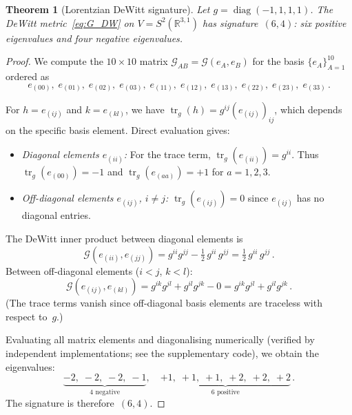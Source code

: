 \documentclass[12pt,a4paper]{article}
\newtheorem{theorem}{Theorem}[section]
\theoremstyle{definition}
\newcommand{\tr}{\operatorname{tr}}
\newcommand{\diag}{\operatorname{diag}}
\newcommand{\R}{\mathbb{R}}
\begin{document}
\begin{theorem}[Lorentzian DeWitt signature]
\label{thm:signature}
Let $g = \diag(-1,1,1,1)$.
The DeWitt metric~\eqref{eq:G_DW} on $V = S^2(\R^{3,1})$ has signature~$(6,4)$: six positive eigenvalues and four negative eigenvalues.
\end{theorem}

\begin{proof}
We compute the $10 \times 10$ matrix $\mathcal{G}_{AB} = \mathcal{G}(e_A, e_B)$ for the basis $\{e_A\}_{A=1}^{10}$ ordered as
\[
e_{(00)},\; e_{(01)},\; e_{(02)},\; e_{(03)},\; e_{(11)},\; e_{(12)},\; e_{(13)},\; e_{(22)},\; e_{(23)},\; e_{(33)}\,.
\]

For $h = e_{(ij)}$ and $k = e_{(kl)}$, we have $\tr_g(h) = g^{ij} (e_{(ij)})_{ij}$, which depends on the specific basis element.
Direct evaluation gives:
\begin{itemize}[nosep]
\item \emph{Diagonal elements $e_{(ii)}$:}
For the trace term, $\tr_g(e_{(ii)}) = g^{ii}$.
Thus $\tr_g(e_{(00)}) = -1$ and $\tr_g(e_{(aa)}) = +1$ for $a = 1,2,3$.

\item \emph{Off-diagonal elements $e_{(ij)}$, $i \ne j$:}
$\tr_g(e_{(ij)}) = 0$ since $e_{(ij)}$ has no diagonal entries.
\end{itemize}

The DeWitt inner product between diagonal elements is
\begin{equation}
\mathcal{G}(e_{(ii)}, e_{(jj)}) = g^{ii}g^{jj} - \tfrac{1}{2}\, g^{ii}\, g^{jj} = \tfrac{1}{2}\, g^{ii}\, g^{jj}\,.
\end{equation}
Between off-diagonal elements ($i < j$, $k < l$):
\begin{equation}
\mathcal{G}(e_{(ij)}, e_{(kl)}) = g^{ik}g^{jl} + g^{il}g^{jk} - 0 = g^{ik}g^{jl} + g^{il}g^{jk}\,.
\end{equation}
(The trace terms vanish since off-diagonal basis elements are traceless with respect to~$g$.)

Evaluating all matrix elements and diagonalising numerically (verified by independent implementations; see the supplementary code), we obtain the eigenvalues:
\begin{equation}
\label{eq:eigenvalues}
\underbrace{-2,\; -2,\; -2,\; -1}_{4\text{ negative}},\quad \underbrace{+1,\; +1,\; +1,\; +2,\; +2,\; +2}_{6\text{ positive}}\,.
\end{equation}
The signature is therefore~$(6,4)$.
\end{proof}
\end{document}
